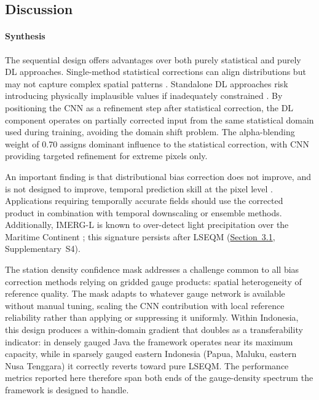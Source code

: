 \documentclass[11pt,a4paper]{article}
\begin{document}
\subsection{Discussion}\label{discussion}

\paragraph{Synthesis}

The sequential design offers advantages over both purely statistical and purely DL approaches. Single-method statistical corrections can align distributions but may not capture complex spatial patterns \cite{ref8,ref44}. Standalone DL approaches risk introducing physically implausible values if inadequately constrained \cite{ref9,ref12}. By positioning the CNN as a refinement step after statistical correction, the DL component operates on partially corrected input from the same statistical domain used during training, avoiding the domain shift problem. The alpha-blending weight of 0.70 assigns dominant influence to the statistical correction, with CNN providing targeted refinement for extreme pixels only.

An important finding is that distributional bias correction does not improve, and is not designed to improve, temporal prediction skill at the pixel level \cite{ref34}. Applications requiring temporally accurate fields should use the corrected product in combination with temporal downscaling or ensemble methods. Additionally, IMERG-L is known to over-detect light precipitation over the Maritime Continent \cite{ref31,ref32}; this signature persists after LSEQM (\hyperref[progressive-improvement]{Section~3.1}, Supplementary~S4).

The station density confidence mask addresses a challenge common to all bias correction methods relying on gridded gauge products: spatial heterogeneity of reference quality. The mask adapts to whatever gauge network is available without manual tuning, scaling the CNN contribution with local reference reliability rather than applying or suppressing it uniformly. Within Indonesia, this design produces a within-domain gradient that doubles as a transferability indicator: in densely gauged Java the framework operates near its maximum capacity, while in sparsely gauged eastern Indonesia (Papua, Maluku, eastern Nusa Tenggara) it correctly reverts toward pure LSEQM. The performance metrics reported here therefore span both ends of the gauge-density spectrum the framework is designed to handle.
\end{document}
